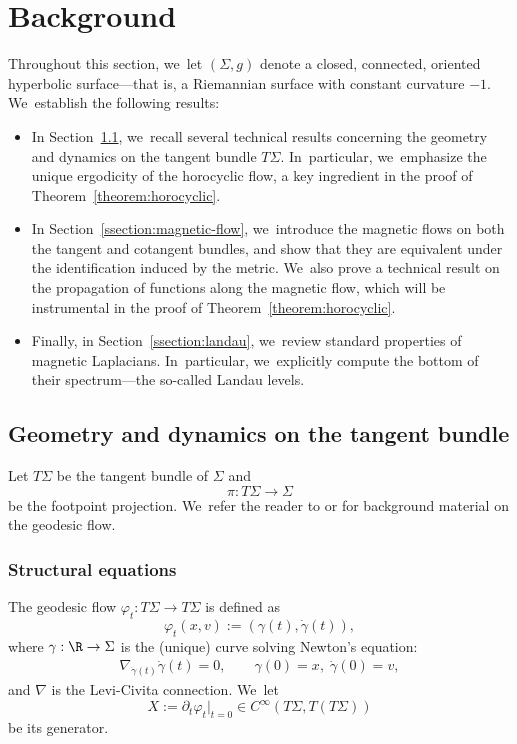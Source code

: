 \section{Background}

\label{section:dynamical-geometric-background}

Throughout this section, we~let $(\Sigma, g)$ denote a closed, connected, oriented hyperbolic surface—that is, a Riemannian surface with constant curvature $-1$. We~establish the following results:

\begin{itemize}
\item In Section~\ref{ssection:geo}, we~recall several technical results concerning the geometry and dynamics on the tangent bundle $T\Sigma$. In~particular, we~emphasize the unique ergodicity of the horocyclic flow, a key ingredient in the proof of Theorem~\ref{theorem:horocyclic}.

\item In Section~\ref{ssection:magnetic-flow}, we~introduce the magnetic flows on both the tangent and cotangent bundles, and show that they are equivalent under the identification induced by the metric. We~also prove a technical result on the propagation of functions along the magnetic flow, which will be instrumental in the proof of Theorem~\ref{theorem:horocyclic}.

\item Finally, in Section~\ref{ssection:landau}, we~review standard properties of magnetic Laplacians. In~particular, we~explicitly compute the bottom of their spectrum—the so-called Landau levels. \end{itemize}

\subsection{Geometry and dynamics on the tangent bundle}

\label{ssection:geo}
Let $T\Sigma$ be the tangent bundle of $\Sigma$ and
\begin{equation}
\label{equation:footpoint}
\pi : T\Sigma \to \Sigma
\end{equation}
be the footpoint projection. We~refer the reader to \cite[Ch.\,1]{Paternain-99} or \cite[Ch.\,13]{Lefeuvre-book} for background material on the geodesic flow.

\subsubsection{Structural equations} The geodesic flow $\varphi_t : T\Sigma \to T\Sigma$ is defined as
\[
\varphi_t(x,v) := (\gamma(t), \dot{\gamma}(t)),
\]
where $\gamma : \R \to \Sigma$ is the (unique) curve solving Newton's equation:
\begin{gather} \label{eq:newton_geodesic}
\nabla_{\dot{\gamma}(t)}\dot{\gamma}(t) = 0, \qquad \gamma(0)=x, \; \dot{\gamma}(0)=v,
\end{gather}
and $\nabla$ is the Levi-Civita connection. We~let
\[
X := \partial_t\varphi_t|_{t=0} \in C^\infty(T\Sigma, T(T\Sigma))
\]
be its generator.


